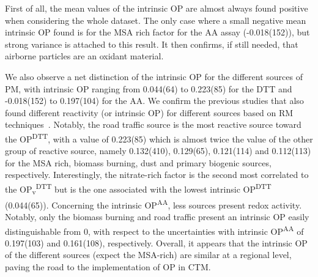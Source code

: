 \documentclass[acp]{copernicus}
\begin{document}
First of all, the mean values of the intrinsic OP are almost always
found positive when considering the whole dataset. The only case where a
small negative mean intrinsic OP found is for the MSA rich factor for
the AA assay (-0.018(152)), but strong variance is attached to this
result. It then confirms, if still needed, that airborne particles are
an oxidant material.

We also observe a net distinction of the intrinsic OP for the different
sources of PM, with intrinsic OP ranging from 0.044(64) to 0.223(85) for
the DTT and -0.018(152) to 0.197(104) for the AA. We confirm the
previous studies that also found different reactivity (or intrinsic OP)
for different sources based on RM
techniques~\citep{ayresEvaluating2008,batesReactive2015,cesariSource2019,costabileEvidence2019,fangOxidative2016,paraskevopoulouYearlong2019,perronePM22019,vermaReactive2014,weberApportionment2018,zhouPredominance2019}.
Notably, the road traffic
source is the most reactive source toward the OP\textsuperscript{DTT},
with a value of 0.223(85) which is almost twice the value of the other
group of reactive source, namely 0.132(410), 0.129(65), 0.121(114) and
0.112(113) for the MSA rich, biomass burning, dust and primary biogenic
sources, respectively. Interestingly, the nitrate-rich factor is the
second most correlated to the OP\textsubscript{v}\textsuperscript{DTT}
but is the one associated with the lowest intrinsic
OP\textsuperscript{DTT} (0.044(65)). Concerning the intrinsic
OP\textsuperscript{AA}, less sources present redox activity. Notably,
only the biomass burning and road traffic present an intrinsic OP easily
distinguishable from 0, with respect to the uncertainties with intrinsic
OP\textsuperscript{AA} of 0.197(103) and 0.161(108), respectively.
Overall, it appears that the intrinsic OP of the different sources
(expect the MSA-rich) are similar at a regional level, paving the road
to the implementation of OP in CTM.
\end{document}
